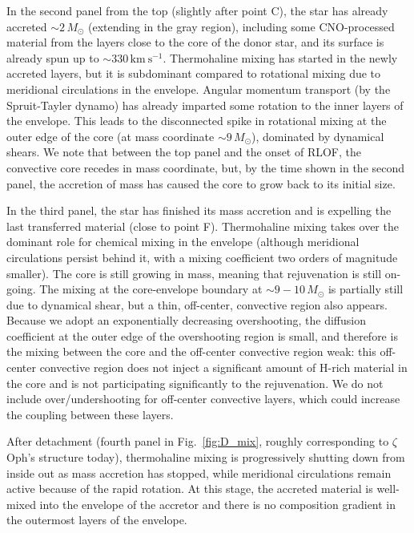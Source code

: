 \documentclass[twocolumn,twocolappendix,trackchanges]{aastex63}
\newcommand{\kms}{{\mathrm{km\ s^{-1}}}}
\DeclareRobustCommand{\Figref}[1]{Fig.~\ref{#1}}
\newcommand{\zoph}{$\zeta$ Oph}
\newcommand{\Msun}{\ensuremath{\,M_\odot}}
\begin{document}
In the second panel from the top (slightly after point C), the star has already accreted
$\sim{}2\,M_\odot$ (extending in the gray region), including some
CNO-processed material from the layers close to the core of the donor star, and its
surface is already spun up to $\sim{}330\,\kms$. Thermohaline mixing
has started in the newly accreted layers, but it is subdominant
compared to rotational mixing due to meridional circulations in the
envelope. Angular momentum transport (by the Spruit-Tayler dynamo) has
already imparted some rotation to the inner layers of the
envelope. This leads to the disconnected spike in rotational mixing at
the outer edge of the core (at mass coordinate $\sim{}9\Msun$),
dominated by dynamical shears.  We note that between the top panel and
the onset of RLOF, the convective core recedes in mass coordinate,
but, by the time shown in the second panel, the accretion of mass has
caused the core to grow back to its initial size.

In the third panel, the star has finished its mass accretion and is expelling the last transferred material (close to point F). Thermohaline mixing takes over the dominant role for chemical mixing in the
envelope (although meridional circulations persist behind it, with a
mixing coefficient two orders of magnitude smaller). The core is still
growing in mass, meaning that rejuvenation is still on-going. The
mixing at the core-envelope boundary at $\sim9-10\Msun$ is partially
still due to dynamical shear, but a thin, off-center, convective
region also appears. Because we adopt an exponentially decreasing
overshooting, the diffusion coefficient at the outer edge of the
overshooting region is small, and therefore is the mixing between the
core and the off-center convective region weak: this off-center
convective region does not inject a significant amount of H-rich
material in the core and is not participating significantly to the
rejuvenation. We do not include
over/undershooting for off-center convective layers, which could
increase the coupling between these layers.

After detachment (fourth panel in \Figref{fig:D_mix}, roughly
corresponding to \zoph's structure today), thermohaline mixing is
progressively shutting down from inside out as mass accretion has stopped, while meridional
circulations remain active because of the rapid rotation. At this stage, the accreted material is well-mixed into the envelope of the accretor and there is no  composition gradient in the outermost layers of the envelope.
\end{document}
